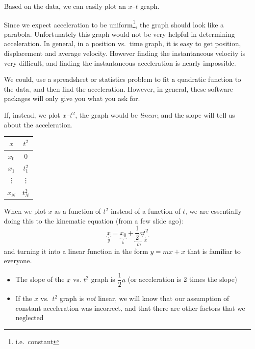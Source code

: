 Based on the data, we can easily plot an $x$--$t$ graph.
\begin{figure}[ht]
  \centering
\end{figure}
Since we expect acceleration to be uniform\footnote{i.e.\ constant}, the graph
should look like a parabola. Unfortunately this graph would not be very helpful
in determining acceleration. In general, in a position vs.\ time graph, it is
easy to get position, displacement and average velocity. However finding the
instantaneous velocity is very difficult, and finding the instantaneous
acceleration is nearly impossible.

We could, use a spreadsheet or statistics problem to fit a quadratic function
to the data, and then find the acceleration. However, in general, these
software packages will only give you what you ask for.

If, instead, we plot $x$--$t^2$, the graph would be \emph{linear}, and the
slope will tell us about the acceleration.
\begin{center}
  \begin{tabular}{c|c}
    $x$ & $t^2$ \\\hline
    $x_0$ & 0 \\
    $x_1$ & $t_1^2$\\
    \vdots & \vdots \\
    $x_N$ & $t_N^2$
  \end{tabular}
\end{center}
\begin{figure}[ht]
  \centering
\end{figure}
When we plot $x$ as a function of $t^2$ instead of a function of $t$, we are
essentially doing this to the kinematic equation (from a few slide ago):
\begin{displaymath}
  \underbrace{x}_y=\underbrace{x_0}_b +
  \underbrace{\frac12a}_m\underbrace{t^2}_x
\end{displaymath}
and turning it into a linear function in the form $y=mx+x$ that is familiar to
everyone.
\begin{itemize}
\item The slope of the $x$ vs. $t^2$ graph is $\dfrac12a$ (or acceleration
  is 2 times the slope)
\item If the $x$ vs.\ $t^2$ graph is \emph{not} linear, we will know that
  our assumption of constant acceleration was incorrect, and that there are
    other factors that we neglected
\end{itemize}


